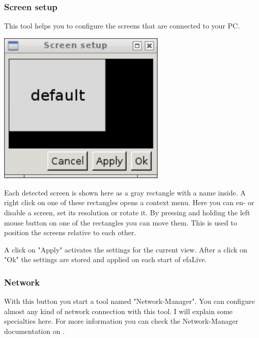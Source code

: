 \documentclass[a4paper,12pt,twoside]{article}
\begin{document}
\subsubsection{Screen setup}
\label{sct:screen_setup}
This tool helps you to configure the screens that are connected to your
PC.

\bigskip
\begin{minipage}{\linewidth}
    \centering
    \captionsetup{type=figure}
    \includegraphics[width=8cm]{screenshots/efaLiveen-img23.png}
    \label{fig:screen_setup}
\end{minipage}
\bigskip

Each detected screen is shown here as a gray rectangle with a name
inside. A right click on one of these rectangles opens a context menu.
Here you can en- or disable a screen, set its resolution or rotate it.
By pressing and holding the left mouse button on one of the rectangles
you can move them. This is used to position the screens relative to
each other.

A click on "Apply" activates the settings
for the current view. After a click on "Ok"
the settings are stored and applied on each start of efaLive.


\subsubsection{Network}
\label{sct:network}
With this button you start a tool named
"Network-Manager". You can configure almost
any kind of network connection with this tool. I will explain some
specialties here. For more information you can check the
Network-Manager documentation on \cite{NWM1}.
\end{document}
